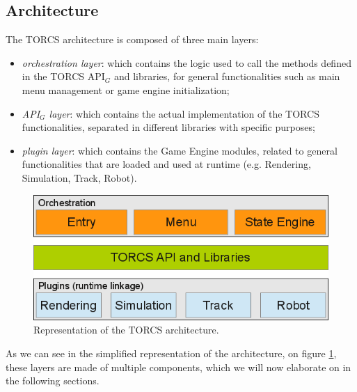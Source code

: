 \subsection{Architecture}
The TORCS architecture is composed of three main layers:
\begin{itemize}
	\item \textit{orchestration layer}: which contains the logic used to call the methods defined in the TORCS API$_G$ and libraries, for general functionalities such as main menu management or game engine initialization;
	\item \textit{API$_G$ layer}: which contains the actual implementation of the TORCS functionalities, separated in different libraries with specific purposes;
	\item \textit{plugin layer}: which contains the Game Engine modules, related to general functionalities that are loaded and used at runtime (e.g. Rendering, Simulation, Track, Robot).
\end{itemize}
\begin{figure}[h!]
	\centering
	\includegraphics[width=0.8\linewidth]{"immagini/Feasibility study/TORCS architecture"}
	\caption[Representation of the TORCS architecture.]{Representation of the TORCS architecture.}
	\label{fig:torcs-architecture}
\end{figure}
As we can see in the simplified representation of the architecture, on figure \ref{fig:torcs-architecture}, these layers are made of multiple components, which we will now elaborate on in the following sections.

